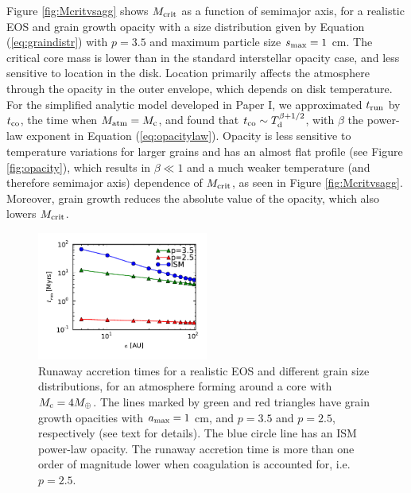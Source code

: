 \documentclass[apj]{emulateapj}
\newcommand{\co}{_{\rm c}}
\begin{document}
Figure \ref{fig:Mcritvsagg} shows $M_{\rm crit}$ as a function of semimajor axis, for a realistic EOS and grain growth opacity with a size distribution given by Equation (\ref{eq:graindistr}) with $p=3.5$ and maximum particle size $s_{\rm max}=1$ cm. The critical core mass is lower than in the standard interstellar opacity case, and less sensitive to location in the disk. Location primarily affects the atmosphere through the opacity in the outer envelope, which depends on disk temperature. For the simplified analytic model developed in Paper I, we approximated $t_{\rm run}$ by  $t_{\rm co}$, the time when $M_{\rm atm}=M\co$, and found that $t_{\rm co} \sim T_{\rm d}^{\beta+1/2}$, with $\beta$ the power-law exponent in Equation (\ref{eq:opacitylaw}). Opacity is less sensitive to temperature variations for larger grains and has an almost flat profile (see Figure \ref{fig:opacity}), which results in $\beta \ll 1$ and a much weaker temperature (and therefore semimajor axis) dependence of $M_{\rm crit}$, as seen in Figure \ref{fig:Mcritvsagg}. Moreover, grain growth reduces the absolute value of the opacity, which also lowers $M_{\rm crit}$. %

\begin{figure}[h!]
\centering
\includegraphics[width=0.5\textwidth]{../../figs/ModelAtmospheres/RadSelfGravRealEOS/PaperFigs/tco_vs_a_Mc4_comp.pdf}
\caption{Runaway accretion times for a realistic EOS and different grain size distributions, for an atmosphere forming around a core with $M\co=4 M_{\oplus}$. The lines marked by green and red triangles have grain growth opacities with $a_{\rm max}=1$ cm, and $p=3.5$ and $p=2.5$, respectively (see text for details). The blue circle line has an ISM power-law opacity. The runaway accretion time is more than one order of magnitude lower when coagulation is accounted for, i.e. $p=2.5$.}
\label{fig:p25p35}
\end{figure}
\end{document}
